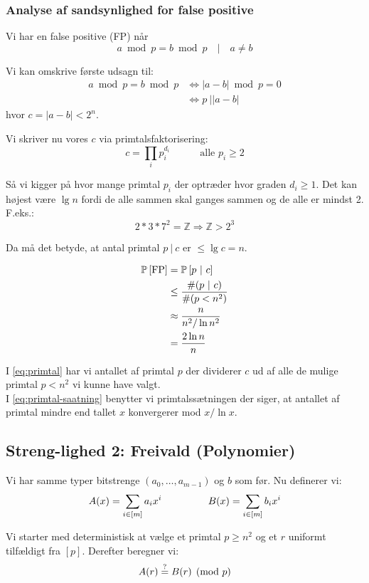 \subsubsection{Analyse af sandsynlighed for false positive}
Vi har en false positive (FP) når
$$
  a \bmod p = b \bmod p \quad | \quad a \neq b
$$

Vi kan omskrive første udsagn til:
\begin{align}
  a \bmod p = b \bmod p
  &\Longleftrightarrow |a - b| \bmod p = 0\\
  &\Longleftrightarrow p \ \big| |a - b|
\end{align}
hvor $c = |a - b| < 2^n$.


Vi skriver nu vores $c$ via primtalsfaktorisering:
$$
  c = \prod_i p_i^{d_i} \quad\quad\quad \text{alle $p_i \geq 2$}
$$

Så vi kigger på hvor mange primtal $p_i$ der optræder hvor graden $d_i \geq 1$. Det kan højest være $\lg n$ fordi de alle sammen skal ganges sammen og de alle er mindst 2. F.eks.:
$$
  2 * 3 * 7^2 = \mathbb Z \Longrightarrow \mathbb Z > 2^3
$$

Da må det betyde, at antal primtal $p \ | \ c$ er $\leq \lg c = n$.

\begin{align}
  \P{\text{FP}}
  &= \P{ p \ | \ c} \nonumber \\
  &\leq \frac{\# (p \ | \ c)}{\# (p < n^2)} \label{eq:primtal} \\
  &\approx \frac{n}{n^2 / \ln n^2} \label{eq:primtal-saatning} \\
  &= \frac{2 \ln n}{n} \nonumber
\end{align}

I \cref{eq:primtal} har vi antallet af primtal $p$ der dividerer $c$ ud af alle de mulige primtal $p < n^2$  vi kunne have valgt.\\
I \cref{eq:primtal-saatning} benytter vi primtalssætningen der siger, at antallet af primtal mindre end tallet $x$ konvergerer mod $x / \ln x$.


\subsection{Streng-lighed 2: Freivald (Polynomier)}
Vi har samme typer bitstrenge $(a_0, \dots, a_{m-1})$ og $b$ som før. Nu definerer vi:
$$
  A(x) = \sum_{i \in [m]} a_i x^i
  \longspace
  B(x) = \sum_{i \in [m]} b_i x^i
$$

Vi starter med deterministisk at vælge et primtal $p \geq n^2$ og et $r$ uniformt tilfældigt fra $[p]$. Derefter beregner vi:
$$
  A(r) \? B(r) \pmod p
$$

